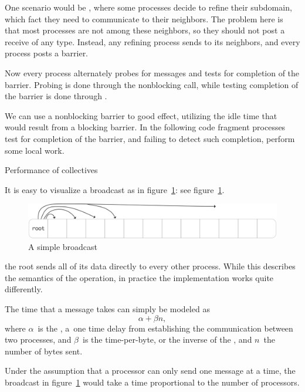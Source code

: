 One scenario would be , where
some processes decide to refine their subdomain, which
fact they need to communicate to their neighbors.
The problem here is that most processes are not among these neighbors,
so they should not post a receive of any type.
Instead, any refining process sends to its neighbors,
and every process posts a barrier.


Now every process alternately probes for messages
and tests for completion of the barrier.
Probing is done through the nonblocking  call,
while testing completion of the barrier is done through
.


We can use a nonblocking barrier to good effect, utilizing the idle
time that would result from a blocking barrier. In the following code
fragment processes test for completion of the barrier, and failing to
detect such completion, perform some local work.


 {Performance of collectives}
\label{sec:collect-perform}

It is easy to visualize a broadcast as in figure~\ref{fig:bcast-simple}:
see figure~\ref{fig:bcast-simple}.
\begin{figure}[ht]
  \includegraphics[scale=.08]{graphics/bcast-simple}
  \caption{A simple broadcast}
  \label{fig:bcast-simple}
\end{figure}
the root sends all of its data directly to every other process.
While this describes the semantics of the operation, in practice
the implementation works quite differently.

The time that a message takes can simply be modeled as
\[ \alpha +\beta n, \]
where $\alpha$~is the , a~one time
delay from establishing the communication between two processes,
and $\beta$~is the time-per-byte, or the inverse of the ,
and $n$~the number of bytes sent.

Under the assumption that
a processor can only send one message at a time,
the broadcast in
figure~\ref{fig:bcast-simple} would take a time proportional to the
number of processors.

